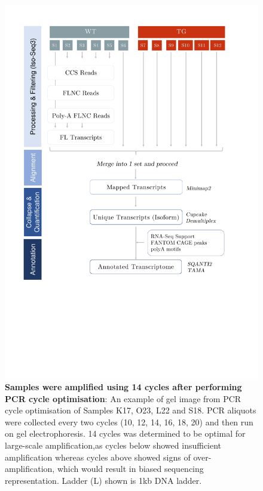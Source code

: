\vspace{1cm}
\begin{figure}[!htp]
	\centering
	\includegraphics[page=2,trim={0 37cm 0 5cm},clip,scale = 0.45]{Figures/Pipeline.pdf}
	\captionsetup{width=0.95\textwidth}
	\caption[Iso-Seq Whole Transcriptome - PCR cycle optimisation]%
	{\textbf{Samples were amplified using 14 cycles after performing PCR cycle optimisation}: An example of gel image from PCR cycle optimisation of Samples K17, O23, L22 and S18. PCR aliquots were collected every two cycles (10, 12, 14, 16, 18, 20) and then run on gel electrophoresis. 14 cycles was determined to be optimal for large-scale amplification,as cycles below showed insufficient amplification whereas cycles above showed signs of over-amplification, which would result in biased sequencing representation. Ladder (L) shown is 1kb DNA ladder.}
	\label{fig:isoseq_whole_pccresults}
\end{figure}

